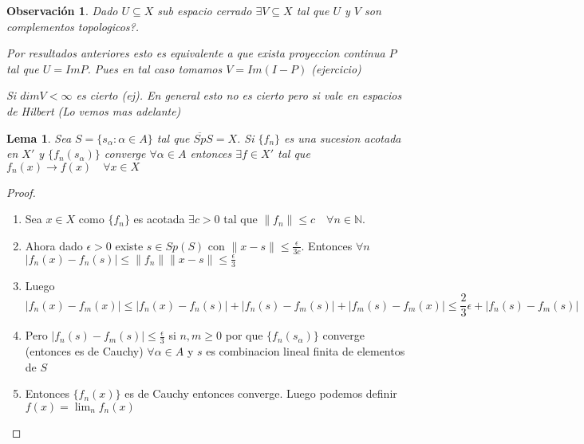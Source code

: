 \documentclass[10pt]{extarticle}
\theoremstyle{break}
\newtheorem{lemma}[theorem]{Lema}
\newtheorem*{remark}{Observación}
\theoremstyle{definition}
\begin{document}
\begin{remark}
	Dado $ U\subseteq X $ sub espacio cerrado $ \exists V\subseteq X $ tal que $ U $ y $ V $ son complementos topologicos?.

	Por resultados anteriores esto es equivalente a que exista proyeccion continua $ P $ tal que $ U=Im P $. Pues en tal caso tomamos $ V=Im(I-P) $ (ejercicio)

	Si $ dim V<\infty  $ es cierto (ej). En general esto no es cierto pero si vale en espacios de Hilbert (Lo vemos mas adelante)
\end{remark}

\begin{lemma}
	Sea $ S= \{s_{\alpha }: \alpha \in A\} $  tal que $ \overline{Sp}S=X $. Si $ \{f_{n} \} $ es una sucesion acotada en $ X' $ y $ \{f_{n} (s_{\alpha })\} $ converge $ \forall \alpha \in A  $ entonces $ \exists f\in X' $ tal que $ f_{n} (x)\longrightarrow f(x)\quad \forall x\in X  $  
\end{lemma}

\begin{proof}
	\begin{enumerate}
		\item Sea $ x\in X $ como $\{f_{n} \}$ es acotada $ \exists c>0 $ tal que $ \lVert f_{n}  \rVert \leq c \quad \forall n\in \mathbb{N} $.
		\item Ahora dado $ \epsilon >0 $ existe $ s\in Sp(S) $ con $ \lVert x-s \rVert \leq \frac{\epsilon }{3c} $. Entonces $ \forall n $ $ \lvert f_{n} (x)-f_{n} (s) \rvert \leq \lVert f_{n}  \rVert \lVert x-s \rVert \leq \frac{\epsilon }{3} $
		\item Luego $$\lvert f_{n} (x)-f_{m}(x) \rvert \leq \lvert f_{n} (x)-f_{n} (s) \rvert +\lvert f_{n} (s)-f_{m}(s) \rvert +\lvert f_{m}(s)-f_{m}(x) \rvert \leq \frac{2}{3}\epsilon +\lvert f_{n} (s)-f_{m}(s) \rvert $$ 
		\item Pero $ \lvert f_{n}(s)-f_{m}(s) \rvert \leq \frac{\epsilon }{3} $ si $ n,m\geq 0 $ por que $ \{f_{n}(s_{\alpha })\}$ converge (entonces es de Cauchy) $ \forall \alpha \in A  $ y $ s $ es combinacion lineal finita de elementos de $ S $
		\item Entonces $\{f_{n}(x)\}$ es de Cauchy entonces converge. Luego podemos definir $f(x)=\lim_{n}f_{n}(x)$
	\end{enumerate}
\end{proof}
\end{document}
